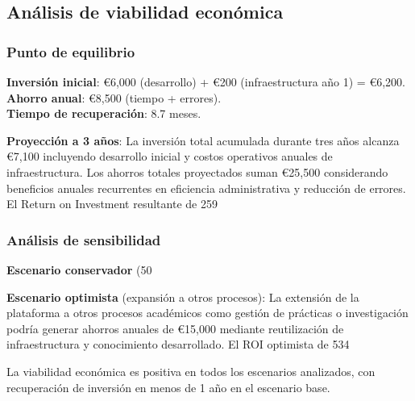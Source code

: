 \documentclass[12pt,a4paper,oneside]{report}
\begin{document}
\subsection{Análisis de viabilidad
económica}\label{anuxe1lisis-de-viabilidad-econuxf3mica}

\subsubsection{Punto de equilibrio}\label{punto-de-equilibrio}

\textbf{Inversión inicial}: €6,000 (desarrollo) + €200 (infraestructura
año 1) = €6,200.\\
\textbf{Ahorro anual}: €8,500 (tiempo + errores).\\
\textbf{Tiempo de recuperación}: 8.7 meses.

\textbf{Proyección a 3 años}: La inversión total acumulada durante tres años alcanza €7,100 incluyendo desarrollo inicial y costos operativos anuales de infraestructura. Los ahorros totales proyectados suman €25,500 considerando beneficios anuales recurrentes en eficiencia administrativa y reducción de errores. El Return on Investment resultante de 259%

\subsubsection{Análisis de
sensibilidad}\label{anuxe1lisis-de-sensibilidad}

\textbf{Escenario conservador} (50%

\textbf{Escenario optimista} (expansión a otros procesos): La extensión de la plataforma a otros procesos académicos como gestión de prácticas o investigación podría generar ahorros anuales de €15,000 mediante reutilización de infraestructura y conocimiento desarrollado. El ROI optimista de 534%

La viabilidad económica es positiva en todos los escenarios analizados,
con recuperación de inversión en menos de 1 año en el escenario base.
\end{document}

